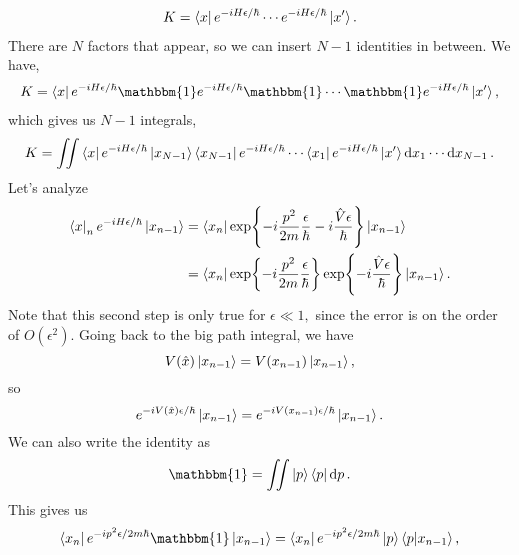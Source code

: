 \documentclass{article}
\numberwithin{equation}{section}
\begin{document}
    \begin{align}
        K = \bra{x}e^{-iH\epsilon/\hbar}\cdots e^{-iH\epsilon/\hbar}\ket{x'}.
    \end{align}
    There are $N$ factors that appear, so we can insert $N-1$ identities in between. We have,
    \begin{align}
        K = \bra{x}e^{-iH\epsilon/\hbar}\mathbbm{1}e^{-iH\epsilon /\hbar}\mathbbm{1}\cdots \mathbbm{1}e^{-iH\epsilon/\hbar}\ket{x'},
    \end{align}
    which gives us $N-1$ integrals, 
    \begin{equation}
        K = \iint \bra{x}e^{-iH\epsilon/\hbar}\ket{x_{N-1}}\bra{x_{N-1}}e^{-iH\epsilon/\hbar}\cdots \bra{x_1}e^{-iH\epsilon/\hbar}\ket{x'} \dd{x}_1\cdots \dd{x}_{N-1}.
    \end{equation}
    Let's analyze
    \begin{align}
        \bra{x}_ne^{-iH\epsilon/\hbar}\ket{x_{n-1}} &= \bra{x_n}\exp{-i\frac{p^2}{2m}\frac{\epsilon}{\hbar} - i\frac{\hat{V}\epsilon}{\hbar}}\ket{x_{n-1}} \\ 
        &=\bra{x_n}\exp{-i\frac{p^2}{2m}\frac{\epsilon}{\hbar}} \exp{-i\frac{\hat{V}\epsilon}{\hbar}}\ket{x_{n-1}}.
    \end{align}
    Note that this second step is only true for $\epsilon \ll 1,$ since the error is on the order of $O(\epsilon^2).$ Going back to the big path integral, we have 
    \begin{equation}
        V(\hat{x})\ket{x_{n-1}} = V(x_{n-1})\ket{x_{n-1}},
    \end{equation}
    so 
    \begin{equation}
        e^{-iV(\hat{x})\epsilon / \hbar}\ket{x_{n-1}} = e^{-iV(x_{n-1})\epsilon/\hbar}\ket{x_{n-1}}.
    \end{equation}
    We can also write the identity as 
    \begin{equation}
        \mathbbm{1} = \iint \ket{p}\bra{p} \dd{p}.
    \end{equation}
    This gives us 
    \begin{equation}
        \bra{x_n}e^{-ip^2\epsilon / 2m\hbar}\mathbbm{1}\ket{x_{n-1}} = \bra{x_n}e^{-ip^2\epsilon / 2m\hbar}\ket{p}\bra{p}\ket{x_{n-1}},
    \end{equation}
\end{document}
